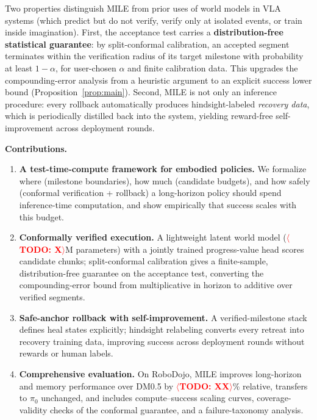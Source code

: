 \documentclass{article}
\newcommand{\mile}{\textsc{MILE}}
\newcommand{\TODO}[1]{\textcolor{red}{\textbf{$\langle$TODO: #1$\rangle$}}}
\begin{document}
Two properties distinguish \mile{} from prior uses of world models in VLA systems (which predict but do not verify, verify only at isolated events, or train inside imagination). First, the acceptance test carries a \textbf{distribution-free statistical guarantee}: by split-conformal calibration, an accepted segment terminates within the verification radius of its target milestone with probability at least $1-\alpha$, for user-chosen $\alpha$ and finite calibration data. This upgrades the compounding-error analysis from a heuristic argument to an explicit success lower bound (Proposition~\ref{prop:main}). Second, \mile{} is not only an inference procedure: every rollback automatically produces hindsight-labeled \emph{recovery data}, which is periodically distilled back into the system, yielding reward-free self-improvement across deployment rounds.

\noindent\textbf{Contributions.}
\begin{enumerate}[leftmargin=1.5em,itemsep=1pt]
  \item \textbf{A test-time-compute framework for embodied policies.} We formalize where (milestone boundaries), how much (candidate budgets), and how safely (conformal verification + rollback) a long-horizon policy should spend inference-time computation, and show empirically that success scales with this budget.
  \item \textbf{Conformally verified execution.} A lightweight latent world model (\TODO{X}M parameters) with a jointly trained progress-value head scores candidate chunks; split-conformal calibration gives a finite-sample, distribution-free guarantee on the acceptance test, converting the compounding-error bound from multiplicative in horizon to additive over verified segments.
  \item \textbf{Safe-anchor rollback with self-improvement.} A verified-milestone stack defines heal states explicitly; hindsight relabeling converts every retreat into recovery training data, improving success across deployment rounds without rewards or human labels.
  \item \textbf{Comprehensive evaluation.} On RoboDojo, \mile{} improves long-horizon and memory performance over DM0.5 by \TODO{XX}\% relative, transfers to $\pi_0$ unchanged, and includes compute--success scaling curves, coverage-validity checks of the conformal guarantee, and a failure-taxonomy analysis.
\end{enumerate}

\end{document}

